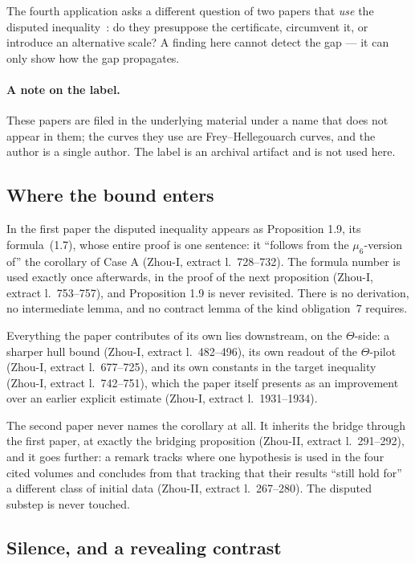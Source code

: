 \documentclass[11pt,a4paper]{article}
\theoremstyle{definition}
\newcommand{\anchor}[2]{(#1, extract l.~#2)}
\begin{document}
The fourth application asks a different question of two papers that \emph{use} the
disputed inequality~\cite{ZhouI, ZhouII}: do they presuppose the certificate,
circumvent it, or introduce an alternative scale? A finding here cannot detect the
gap --- it can only show how the gap propagates.

\paragraph{A note on the label.} These papers are filed in the underlying material
under a name that does not appear in them; the curves they use are
Frey--Hellegouarch curves, and the author is a single author. The label is an
archival artifact and is not used here.

\subsection{Where the bound enters}

In the first paper the disputed inequality appears as Proposition 1.9, its
formula~(1.7), whose entire proof is one sentence: it ``follows from the
$\mu_6$-version of'' the corollary of Case A \anchor{Zhou-I}{728--732}. The formula
number is used exactly once afterwards, in the proof of the next proposition
\anchor{Zhou-I}{753--757}, and Proposition 1.9 is never revisited.
There is no derivation, no intermediate lemma, and no contract lemma of the kind
obligation~7 requires.

Everything the paper contributes of its own lies downstream, on the $\Theta$-side:
a sharper hull bound \anchor{Zhou-I}{482--496}, its own readout of the
$\Theta$-pilot \anchor{Zhou-I}{677--725}, and its own constants in the target
inequality \anchor{Zhou-I}{742--751}, which the paper itself presents as an
improvement over an earlier explicit estimate \anchor{Zhou-I}{1931--1934}.

The second paper never names the corollary at all. It inherits the bridge through
the first paper, at exactly the bridging proposition
\anchor{Zhou-II}{291--292}, and it goes further: a remark tracks where one
hypothesis is used in the four cited volumes and concludes from that tracking that
their results ``still hold for'' a different class of initial data
\anchor{Zhou-II}{267--280}. The disputed substep is never touched.

\subsection{Silence, and a revealing contrast}
\end{document}
